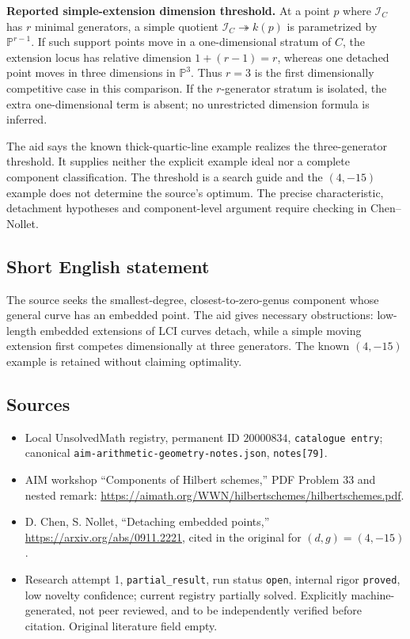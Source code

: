 \documentclass[11pt]{article}
\newcommand{\PP}{\mathbb{P}}
\begin{document}
\textbf{Reported simple-extension dimension threshold.} At a point $p$ where $\mathcal I_C$ has $r$ minimal generators, a simple quotient $\mathcal I_C\twoheadrightarrow k(p)$ is parametrized by $\PP^{r-1}$. If such support points move in a one-dimensional stratum of $C$, the extension locus has relative dimension $1+(r-1)=r$, whereas one detached point moves in three dimensions in $\PP^3$. Thus $r=3$ is the first dimensionally competitive case in this comparison. If the $r$-generator stratum is isolated, the extra one-dimensional term is absent; no unrestricted dimension formula is inferred.

The aid says the known thick-quartic-line example realizes the three-generator threshold. It supplies neither the explicit example ideal nor a complete component classification. The threshold is a search guide and the $(4,-15)$ example does not determine the source's optimum. The precise characteristic, detachment hypotheses and component-level argument require checking in Chen--Nollet.
\subsection{Short English statement}
The source seeks the smallest-degree, closest-to-zero-genus component whose general curve has an embedded point. The aid gives necessary obstructions: low-length embedded extensions of LCI curves detach, while a simple moving extension first competes dimensionally at three generators. The known $(4,-15)$ example is retained without claiming optimality.
\subsection{Sources}
\begin{itemize}
\item Local UnsolvedMath registry, permanent ID $20000834$, \texttt{catalogue entry}; canonical \texttt{aim-arithmetic-geometry-notes.json}, \texttt{notes[79]}.
\item AIM workshop ``Components of Hilbert schemes,'' PDF Problem 33 and nested remark: \url{https://aimath.org/WWN/hilbertschemes/hilbertschemes.pdf}.
\item D. Chen, S. Nollet, ``Detaching embedded points,'' \url{https://arxiv.org/abs/0911.2221}, cited in the original for $(d,g)=(4,-15)$.
\item Research attempt 1, \texttt{partial\_result}, run status \texttt{open}, internal rigor \texttt{proved}, low novelty confidence; current registry partially solved. Explicitly machine-generated, not peer reviewed, and to be independently verified before citation. Original literature field empty.
\end{itemize}
\end{document}
